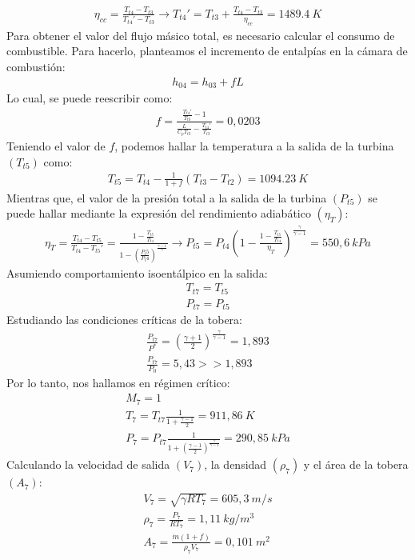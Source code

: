 \documentclass{report}
\begin{document}
\begin{gather}
\eta_{cc}=\frac{T_{t4}-T_{t3}}{T_{t4}'-T_{t3}}\xrightarrow{}T_{t4}'=T_{t3}+\frac{T_{t4}-T_{t3}}{\eta_{cc}}=1489.4\:K
\end{gather}
Para obtener el valor del flujo másico total, es necesario calcular el consumo de combustible. Para hacerlo, planteamos el incremento de entalpías en la cámara de combustión:
\begin{gather}
h_{04}=h_{03}+fL
\end{gather}
Lo cual, se puede reescribir como:
\begin{gather}
f=\frac{\frac{T_{t4}'}{T_{t3}}-1}{\frac{L}{C_p T_{t3}}-\frac{T_{t4}'}{T_{t3}}}=0,0203
\end{gather}
Teniendo el valor de $f$, podemos hallar la temperatura a la salida de la turbina $(T_{t5})$ como:
\begin{gather}
T_{t5}=T_{t4}-\frac{1}{1+f}(T_{t3}-T_{t2})=1094.23\:K
\end{gather}
Mientras que, el valor de la presión total a la salida de la turbina $(P_{t5})$ se puede hallar mediante la expresión del rendimiento adiabático $(\eta_T)$:
\begin{gather}
\eta_T = \frac{T_{t4}-T_{t5}}{T_{t4}-T_{t5}'}=\frac{1-\frac{T_{t5}}{T_{t4}}}{1-\left(\frac{P_t5}{P_t4}\right)^\frac{\gamma-1}{\gamma}}\xrightarrow{}P_{t5}=P_{t4}\left(1-\frac{1-\frac{T_{t5}}{T_{t4}}}{\eta_T}\right)^\frac{\gamma}{\gamma-1}=550,6\:kPa
\end{gather}
Asumiendo comportamiento isoentálpico en la salida:
\begin{gather}
T_{t7} = T_{t5}\\
P_{t7} = P_{t5}
\end{gather}
Estudiando las condiciones críticas de la tobera:
\begin{gather}
\frac{P_{t7}}{P^*}=\left(\frac{\gamma+1}{2}\right)^\frac{\gamma}{\gamma-1}=1,893\\
\frac{P_{t7}}{P_0}=5,43 >> 1,893
\end{gather}
Por lo tanto, nos hallamos en régimen crítico:
\begin{gather}
M_7 = 1\\
T_7 = T_{t7} \frac{1}{1 + \frac{\gamma - 1}{2}} = 911,86\:K\\
P_7 = P_{t7} \frac{1}{1 + \left(\frac{\gamma - 1}{2}\right)^\frac{\gamma}{\gamma-1}}=290,85\:kPa
\end{gather}
Calculando la velocidad de salida $(V_7)$, la densidad $(\rho_7)$ y el área de la tobera $(A_7)$:
\begin{gather}
V_7 = \sqrt{\gamma R T_7}=605,3\:m/s\\
\rho_7 = \frac{P_7}{R T_7}=1,11\:kg/m^3\\
A_7 = \frac{\Dot{m} (1+f)}{\rho_7 V_7}=0,101\:m^2
\end{gather}
\end{document}
